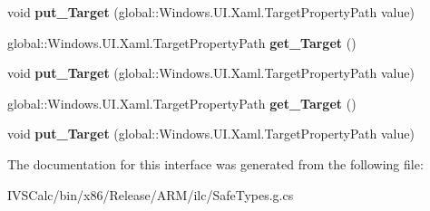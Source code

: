 \begin{DoxyCompactItemize}
void {\bfseries put\+\_\+\+Target} (global\+::\+Windows.\+U\+I.\+Xaml.\+Target\+Property\+Path value)
\item 
\mbox{\label{interface_windows_1_1_u_i_1_1_xaml_1_1_i_setter2_a39b568010bc59926a8e2729ca6ab951d}} 
global\+::\+Windows.\+U\+I.\+Xaml.\+Target\+Property\+Path {\bfseries get\+\_\+\+Target} ()
\item 
\mbox{\label{interface_windows_1_1_u_i_1_1_xaml_1_1_i_setter2_ac9ec74ff10779379bf48722561a84016}} 
void {\bfseries put\+\_\+\+Target} (global\+::\+Windows.\+U\+I.\+Xaml.\+Target\+Property\+Path value)
\item 
\mbox{\label{interface_windows_1_1_u_i_1_1_xaml_1_1_i_setter2_a39b568010bc59926a8e2729ca6ab951d}} 
global\+::\+Windows.\+U\+I.\+Xaml.\+Target\+Property\+Path {\bfseries get\+\_\+\+Target} ()
\item 
\mbox{\label{interface_windows_1_1_u_i_1_1_xaml_1_1_i_setter2_ac9ec74ff10779379bf48722561a84016}} 
void {\bfseries put\+\_\+\+Target} (global\+::\+Windows.\+U\+I.\+Xaml.\+Target\+Property\+Path value)
\end{DoxyCompactItemize}


The documentation for this interface was generated from the following file\+:\begin{DoxyCompactItemize}
\item 
I\+V\+S\+Calc/bin/x86/\+Release/\+A\+R\+M/ilc/Safe\+Types.\+g.\+cs\end{DoxyCompactItemize}
